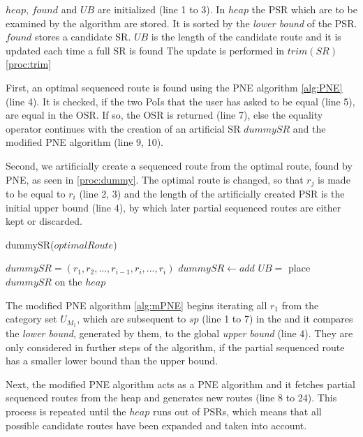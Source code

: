 \pagebreak

$heap$, $found$ and $UB$ are initialized (line 1 to 3). In $heap$ the PSR which are to be examined by the algorithm are stored. It is sorted by the \textit{lower bound} of the PSR. $found$ stores a candidate SR. $UB$ is the length of the candidate route and it is updated each time a full SR is found The update is performed in $trim(SR)$ \ref{proc:trim}

First, an optimal sequenced route is found using the PNE algorithm \ref{alg:PNE} (line 4). It is checked, if the two PoIs that the user has asked to be equal (line 5), are equal in the OSR. If so, the OSR is returned (line 7), else the equality operator continues with the creation of an artificial SR $dummySR$ and the modified PNE algorithm (line 9, 10). 

Second, we artificially create a sequenced route from the optimal route, found by PNE, as seen in \ref{proc:dummy}. The optimal route is changed, so that $r_j$ is made to be equal to $r_i$ (line 2, 3) and the length of the artificially created PSR is the initial upper bound (line 4), by which later partial sequenced routes are either kept or discarded.

\begin{procedure}[H]
	\label{proc:dummy}
	\caption{dummySR($optimalRoute$)}
	
	$dummySR = (r_1, r_2, ..., r_{i-1}, r_i, ..., r_i)$ 
	$dummySR \leftarrow add$ \;
	$UB =$ \;
	place $dummySR$ on the $heap$\;
\end{procedure}

The modified PNE algorithm \ref{alg:mPNE} begins iterating all $r_1$ from the category set $U_{M_1}$, which are subsequent to $sp$ (line 1 to 7) in the and it compares the \textit{lower bound}, generated by them, to the global \textit{upper bound} (line 4). They are only considered in further steps of the algorithm, if the partial sequenced route has a smaller lower bound than the upper bound.

Next, the modified PNE algorithm acts as a PNE algorithm and it fetches partial sequenced routes from the heap and generates new routes (line 8 to 24). This process is repeated until the $heap$ runs out of PSRs, which means that all possible candidate routes have been expanded and taken into account.

